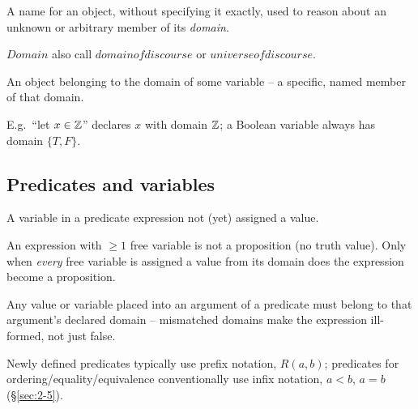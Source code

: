 \begin{definition}[Variable]
A name for an object, without specifying it exactly, used to reason about an unknown or arbitrary member of its \emph{domain}.
\end{definition}

\begin{note}[Domain]
    $Domain$ also call $domain of discourse$ or $universe of discourse$.
\end{note}

\begin{definition}[Constant]
An object belonging to the domain of some variable -- a specific, named member of that domain.
\end{definition}

\begin{note}
E.g.\ ``let $x\in\mathbb{Z}$'' declares $x$ with domain $\mathbb{Z}$; a Boolean variable always has domain $\{T,F\}$.
\end{note}

\subsection{Predicates and variables}
\label{sec:5-3}

\begin{definition}
A variable in a predicate expression not (yet) assigned a value.
\end{definition}

\begin{note}
An expression with $\ge1$ free variable is not a proposition (no truth value). Only when \emph{every} free variable is assigned a value from its domain does the expression become a proposition.
\end{note}

\begin{note}
Any value or variable placed into an argument of a predicate must belong to that argument's declared domain -- mismatched domains make the expression ill-formed, not just false.
\end{note}

\begin{note}
Newly defined predicates typically use prefix notation, $R(a,b)$; predicates for ordering/equality/equivalence conventionally use infix notation, $a<b$, $a=b$ (\S\ref{sec:2-5}).
\end{note}

